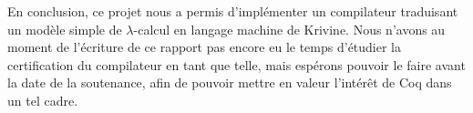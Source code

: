 \documentclass[a4paper,twoside,12pt]{article}
\begin{document}
\begin{conclusion}
\begin{paragraph}{}
En conclusion, ce projet nous a permis d'implémenter un compilateur traduisant un modèle simple de $\lambda$-calcul en langage machine de Krivine. Nous n'avons au moment de l'écriture de ce rapport pas encore eu le temps d'étudier la certification du compilateur en tant que telle, mais espérons pouvoir le faire avant la date de la soutenance, afin de pouvoir mettre en valeur l'intérêt de Coq dans un tel cadre.
\end{paragraph}
\end{conclusion}

\end{document}
